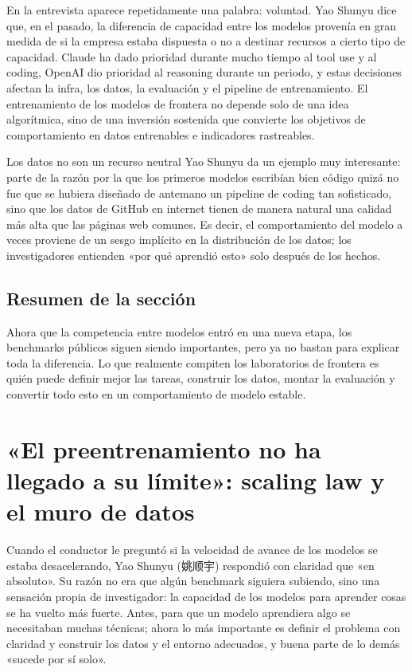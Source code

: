 \documentclass[a4paper]{article}
\begin{document}
En la entrevista aparece repetidamente una palabra: voluntad. Yao Shunyu dice que, en el pasado, la diferencia de capacidad entre los modelos provenía en gran medida de si la empresa estaba dispuesta o no a destinar recursos a cierto tipo de capacidad. Claude ha dado prioridad durante mucho tiempo al tool use y al coding, OpenAI dio prioridad al reasoning durante un periodo, y estas decisiones afectan la infra, los datos, la evaluación y el pipeline de entrenamiento. El entrenamiento de los modelos de frontera no depende solo de una idea algorítmica, sino de una inversión sostenida que convierte los objetivos de comportamiento en datos entrenables e indicadores rastreables.

\begin{knowledgebox}{Los datos no son un recurso neutral}
Yao Shunyu da un ejemplo muy interesante: parte de la razón por la que los primeros modelos escribían bien código quizá no fue que se hubiera diseñado de antemano un pipeline de coding tan sofisticado, sino que los datos de GitHub en internet tienen de manera natural una calidad más alta que las páginas web comunes. Es decir, el comportamiento del modelo a veces proviene de un sesgo implícito en la distribución de los datos; los investigadores entienden «por qué aprendió esto» solo después de los hechos.
\end{knowledgebox}

\subsection{Resumen de la sección}

Ahora que la competencia entre modelos entró en una nueva etapa, los benchmarks públicos siguen siendo importantes, pero ya no bastan para explicar toda la diferencia. Lo que realmente compiten los laboratorios de frontera es quién puede definir mejor las tareas, construir los datos, montar la evaluación y convertir todo esto en un comportamiento de modelo estable.

\section{«El preentrenamiento no ha llegado a su límite»: scaling law y el muro de datos}

Cuando el conductor le preguntó si la velocidad de avance de los modelos se estaba desacelerando, Yao Shunyu (姚顺宇) respondió con claridad que «en absoluto». Su razón no era que algún benchmark siguiera subiendo, sino una sensación propia de investigador: la capacidad de los modelos para aprender cosas se ha vuelto más fuerte. Antes, para que un modelo aprendiera algo se necesitaban muchas técnicas; ahora lo más importante es definir el problema con claridad y construir los datos y el entorno adecuados, y buena parte de lo demás «sucede por sí solo».
\end{document}
